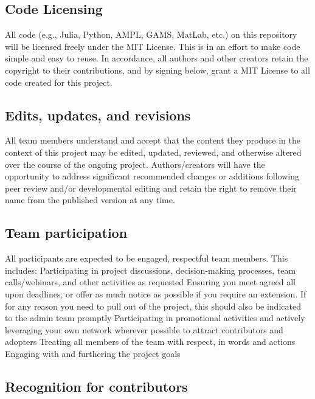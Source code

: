 \hypertarget{code-licensing}{%
\subsection{Code Licensing}\label{code-licensing}}

All code (e.g., Julia, Python, AMPL, GAMS, MatLab, etc.) on this
repository will be licensed freely under the MIT License. This is in an
effort to make code simple and easy to reuse. In accordance, all authors
and other creators retain the copyright to their contributions, and by
signing below, grant a MIT License to all code created for this project.

\hypertarget{edits-updates-and-revisions}{%
\subsection{Edits, updates, and
revisions}\label{edits-updates-and-revisions}}

All team members understand and accept that the content they produce in
the context of this project may be edited, updated, reviewed, and
otherwise altered over the course of the ongoing project.
Authors/creators will have the opportunity to address significant
recommended changes or additions following peer review and/or
developmental editing and retain the right to remove their name from the
published version at any time.

\hypertarget{team-participation}{%
\subsection{Team participation}\label{team-participation}}

All participants are expected to be engaged, respectful team members.
This includes: Participating in project discussions, decision-making
processes, team calls/webinars, and other activities as requested
Ensuring you meet agreed all upon deadlines, or offer as much notice as
possible if you require an extension. If for any reason you need to pull
out of the project, this should also be indicated to the admin team
promptly Participating in promotional activities and actively leveraging
your own network wherever possible to attract contributors and adopters
Treating all members of the team with respect, in words and actions
Engaging with and furthering the project goals

\hypertarget{recognition-for-contributors}{%
\subsection{Recognition for
contributors}\label{recognition-for-contributors}}

